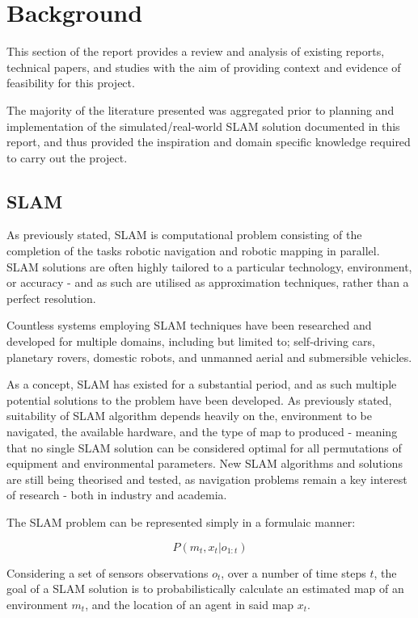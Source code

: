 \section{Background} \label{sec_background}
This section of the report provides a review and analysis of existing reports,
technical papers, and studies with the aim of providing context and evidence
of feasibility for this project.

The majority of the literature presented was aggregated prior to planning and
implementation of the simulated/real-world SLAM solution documented in this
report, and thus provided the inspiration and domain specific knowledge
required to carry out the project.


\subsection{SLAM} \label{sec_slam}
As previously stated, SLAM is computational problem consisting of the
completion of the tasks robotic navigation and robotic mapping in parallel.
SLAM solutions are often highly tailored to a particular technology,
environment, or accuracy - and as such are utilised as approximation
techniques, rather than a perfect resolution.

Countless systems employing SLAM techniques have been researched and developed
for multiple domains, including but limited to; self-driving cars, planetary
rovers, domestic robots, and unmanned aerial and submersible vehicles.

As a concept, SLAM has existed for a substantial period, and as such multiple
potential solutions to the problem have been developed.
As previously stated, suitability of SLAM algorithm depends heavily on the,
environment to be navigated, the available hardware, and the type of map to
produced - meaning that no single SLAM solution can be considered optimal for
all permutations of equipment and environmental parameters.
New SLAM algorithms and solutions are still being theorised and tested, as
navigation problems remain a key interest of research - both in industry and
academia.

The SLAM problem can be represented simply in a formulaic manner:

\[ P(m_t,x_t|o_{1:t}) \]

Considering a set of sensors observations \(o_t \), over a number of time
steps \(t\), the goal of a SLAM solution is to probabilistically calculate an
estimated map of an environment \(m_t\), and the location of an agent in said
map \(x_t\).


